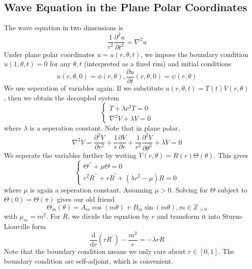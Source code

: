 \subsection{Wave Equation in the Plane Polar Coordinates}
The wave equation in two dimensions is
$$\frac{1}{c^2}\frac{\partial^2u}{\partial t^2}=\nabla^2u$$
Under plane polar coordinates $u=u(r,\theta,t)$, we impose the boundary condition $u(1,\theta,t)=0$ for any $\theta,t$ (interpreted as a fixed rim) and initial conditions
$$u(r,\theta,0)=\phi(r,\theta),\frac{\partial u}{\partial t}(r,\theta,0)=\psi(r,\theta)$$
We use seperation of variables again.
If we substitute $u(r,\theta,t)=T(t)V(r,\theta)$, then we obtain the decoupled system
$$\begin{cases}
    \ddot{T}+\lambda c^2T=0\\
    \nabla^2V+\lambda V=0
\end{cases}$$
where $\lambda$ is a seperation constant.
Note that in plane polar,
$$\nabla^2V=\frac{\partial^2V}{\partial r^2}+\frac{1}{r}\frac{\partial V}{\partial r}+\frac{1}{r^2}\frac{\partial^2V}{\partial\theta^2}+\lambda V=0$$
We seperate the variables further by writing $V(r,\theta)=R(r)\Theta(\theta)$.
This gives
$$\begin{cases}
    \Theta^{\prime\prime}+\mu\Theta=0\\
    r^2R^{\prime\prime}+rR^\prime+(\lambda r^2-\mu)R=0
\end{cases}$$
where $\mu$ is again a seperation constant.
Assuming $\mu>0$.
Solving for $\Theta$ subject to $\Theta(0)=\Theta(\pi)$ gives our old friend
$$\Theta_m(\theta)=A_m\cos(m\theta)+B_m\sin(m\theta),m\in\mathbb Z_{>0}$$
with $\mu_m=m^2$.
For $R$, we divide the equation by $r$ and transform it into Sturm-Liouville form
$$\frac{\mathrm d}{\mathrm dr}(rR^\prime)-\frac{m^2}{r}=-\lambda rR$$
Note that the boundary condition means we only care about $r\in[0,1]$.
The boundary condition are self-adjoint, which is convenient.
